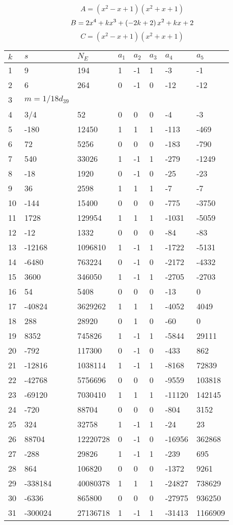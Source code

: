 \documentclass{amsart}
\begin{document}
$$A=(x^2
 - x
 + 1)(x^2
 + x
 + 1)$$
$$B=2\*x^4
 + k\*x^3
 + \left(-2\*k
 + 2\right) \*x^2
 + k\*x
 + 2$$
$$C=(x^2
 - x
 + 1)(x^2
 + x
 + 1)$$
\begin{longtable}{|l|l|l|lllll|}
\hline
$k$ & $s$ & $N_E$ & $a_1$ & $a_2$ & $a_3$ & $a_4$ & $a_5$\\
\hline
1&9&194&1&-1&1&-3&-1\\
2&6&264&0&-1&0&-12&-12\\
3&$m=1/18d_{39}$&&\multicolumn{5}{c|}{}\\
4&3/4&52&0&0&0&-4&-3\\
5&-180&12450&1&1&1&-113&-469\\
6&72&5256&0&0&0&-183&-790\\
7&540&33026&1&-1&1&-279&-1249\\
8&-18&1920&0&-1&0&-25&-23\\
9&36&2598&1&1&1&-7&-7\\
10&-144&15400&0&0&0&-775&-3750\\
11&1728&129954&1&1&1&-1031&-5059\\
12&-12&1332&0&0&0&-84&-83\\
13&-12168&1096810&1&-1&1&-1722&-5131\\
14&-6480&763224&0&-1&0&-2172&-4332\\
15&3600&346050&1&-1&1&-2705&-2703\\
16&54&5408&0&0&0&-13&0\\
17&-40824&3629262&1&1&1&-4052&4049\\
18&288&28920&0&1&0&-60&0\\
19&8352&745826&1&-1&1&-5844&29111\\
20&-792&117300&0&-1&0&-433&862\\
21&-12816&1038114&1&-1&1&-8168&72839\\
22&-42768&5756696&0&0&0&-9559&103818\\
23&-69120&7030410&1&1&1&-11120&142145\\
24&-720&88704&0&0&0&-804&3152\\
25&324&32758&1&-1&1&-24&23\\
26&88704&12220728&0&-1&0&-16956&362868\\
27&-288&29826&1&-1&1&-239&695\\
28&864&106820&0&0&0&-1372&9261\\
29&-338184&40080378&1&1&1&-24827&738629\\
30&-6336&865800&0&0&0&-27975&936250\\
31&-300024&27136718&1&-1&1&-31413&1166909\\

\end{longtable}
\end{document}
